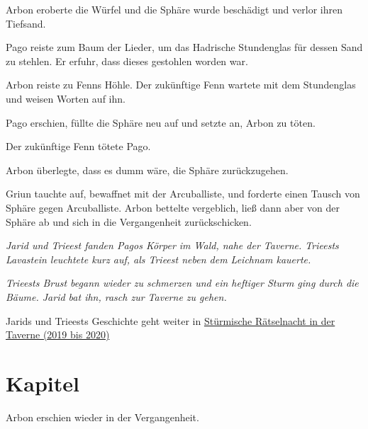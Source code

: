 
Arbon eroberte die Würfel und die Sphäre wurde beschädigt und verlor ihren Tiefsand.

Pago reiste zum Baum der Lieder, um das Hadrische Stundenglas für dessen Sand zu stehlen. Er erfuhr, dass dieses gestohlen worden war. 

Arbon reiste zu Fenns Höhle. Der zukünftige Fenn wartete mit dem Stundenglas und weisen Worten auf ihn.

Pago erschien, füllte die Sphäre neu auf und setzte an, Arbon zu töten.

Der zukünftige Fenn tötete Pago.

Arbon überlegte, dass es dumm wäre, die Sphäre zurückzugehen.

Griun tauchte auf, bewaffnet mit der Arcuballiste, und forderte einen Tausch von Sphäre gegen Arcuballiste. Arbon bettelte vergeblich, ließ dann aber von der Sphäre ab und sich in die Vergangenheit zurückschicken.

\trennzeichen

\textit{Jarid und Trieest fanden Pagos Körper im Wald, nahe der Taverne. Trieests Lavastein leuchtete kurz auf, als Trieest neben dem Leichnam kauerte.}

\textit{Trieests Brust begann wieder zu schmerzen und ein heftiger Sturm ging durch die Bäume. Jarid bat ihn, rasch zur Taverne zu gehen.}


\begin{commentbox}
    Jarids und Trieests Geschichte geht weiter in \hyperref[2019-2020-stuermische-raetselnacht-in-der-taverne]{Stürmische Rätselnacht in der Taverne (2019 bis 2020)}
\end{commentbox}




\newpage
\section{Kapitel}



Arbon erschien wieder in der Vergangenheit.

